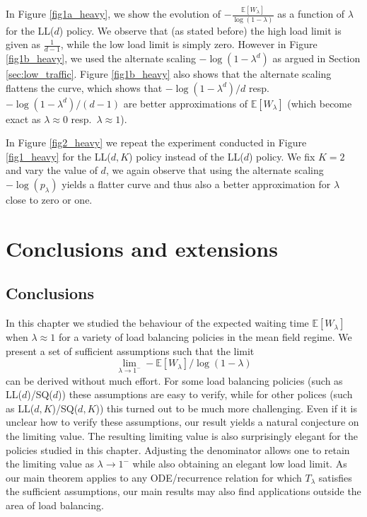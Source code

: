 \documentclass[12pt]{report}
\newcommand{\E}{\mathbb{E}}
\begin{document}
In Figure \ref{fig1a_heavy}, we show the evolution of $-\frac{\E[W_\lambda]}{\log(1-\lambda)}$ as a function of $\lambda$ for the LL($d$) policy. We observe that (as stated before) the high load limit is given as $\frac{1}{d-1}$, while the low load limit is simply zero. However in Figure \ref{fig1b_heavy}, we used the alternate scaling $-\log(1-\lambda^d)$ as argued in Section \ref{sec:low_traffic}.  Figure \ref{fig1b_heavy} also shows that the alternate
scaling flattens the curve, which shows that $-\log(1-\lambda^d)/d$ resp.~$-\log(1-\lambda^d)/(d-1)$ are better approximations of $\E[W_\lambda]$ (which become exact as $\lambda \approx 0$ resp.~$\lambda \approx 1$).

In Figure \ref{fig2_heavy} we repeat the experiment conducted in Figure \ref{fig1_heavy} for the LL($d, K$) policy instead of the LL($d$) policy. We fix $K=2$ and vary the value of $d$, we again observe that using the alternate scaling $-\log(p_\lambda)$ yields a flatter curve and thus also a better
approximation for $\lambda$ close to zero or one.

\section{Conclusions and extensions}\label{sec:concl}
\subsection*{Conclusions}
In this chapter we studied the behaviour of the expected waiting time $\E[W_\lambda]$ when $\lambda \approx 1$ for a variety of load balancing policies in the mean field regime. We present a set of sufficient assumptions such that the limit 
$$
\lim_{\lambda \rightarrow 1^-} -\E[W_\lambda]/\log(1-\lambda)
$$
can be derived without much effort. For some load balancing policies (such as LL($d$)/SQ($d$)) these assumptions are easy to verify, while for other polices (such as LL($d,K$)/SQ($d,K$)) this turned out to be much more challenging. Even if it is unclear how to verify these assumptions, our result yields a natural conjecture on the limiting value. The resulting limiting value is also surprisingly elegant for the policies studied in this chapter. Adjusting the denominator allows one to retain the limiting value as $\lambda \rightarrow 1^-$ while also obtaining an elegant low load limit.
As our main theorem applies to any ODE/recurrence relation for which $T_\lambda$ satisfies the sufficient assumptions, our main results may also find applications outside the area of load balancing. 
\end{document}
